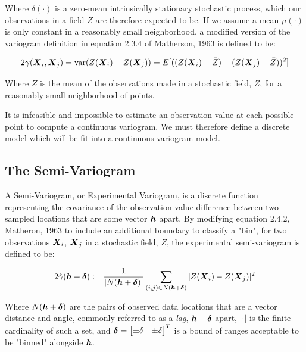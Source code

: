 \documentclass[11pt]{ucthesis}
\newcommand{\vect}[1]{{\it{\boldsymbol{#1}}}}
\begin{document}
Where $\delta(\cdot)$ is a zero-mean intrinsically stationary stochastic process, which our observations in a field $Z$ are therefore expected to be. If we assume a mean $\mu(\cdot)$ is only constant in a reasonably small neighborhood, a modified version of the variogram definition in equation 2.3.4 of Matherson, 1963 \cite{matheron:geostat} is defined to be:

\begin{equation}
	2\gamma(\vect{X}_i, \vect{X}_j)= \text{var} (Z(\vect{X}_{i}) - Z(\vect{X}_{j}))=E[( (Z(\vect{X}_{i}) - \bar{Z} ) - (Z(\vect{X}_{j}) - \bar{Z} ))^2]
    \label{eq:cont_var}
\end{equation}

Where $\bar{Z}$ is the mean of the observations made in a stochastic field, $Z$, for a reasonably small neighborhood of points.

It is infeasible and impossible to estimate an observation value at each possible point to compute a continuous variogram. We must therefore define a discrete model which will be fit into a continuous variogram model.

\subsection{The Semi-Variogram}
A Semi-Variogram, or Experimental Variogram, is a discrete function representing the covariance of the observation value difference between two sampled locations that are some vector $\vect{h}$ apart. By modifying equation 2.4.2, Matheron, 1963 \cite{matheron:geostat} to include an additional boundary to classify a "bin", for two observations $\vect{X}_{i}$, $\vect{X}_{j}$ in a stochastic field, $Z$, the experimental semi-variogram is defined to be:

\begin{equation} 
    \label{eq:exp_var}
    2\hat{\gamma}(\vect{h}+\vect{\delta}) := \frac{1}{|N(\vect{h}+\vect{\delta})|}\sum\limits_{(i,j)\in N(\vect{h}+\vect{\delta})}|Z(\vect{X}_i) - Z(\vect{X}_j)|^2 %
\end{equation}

Where $N(\vect{h}+\vect{\delta})$ are the pairs of observed data locations that are a vector distance and angle, commonly referred to as a \textit{lag}, $\vect{h}+\vect{\delta}$ apart, $|\cdot|$ is the finite cardinality of such a set, and $\vect{\delta} = \begin{bmatrix}\pm\delta & \pm\delta\end{bmatrix}^{T}$ is a bound of ranges acceptable to be "binned" alongside $\vect{h}$.
\end{document}
